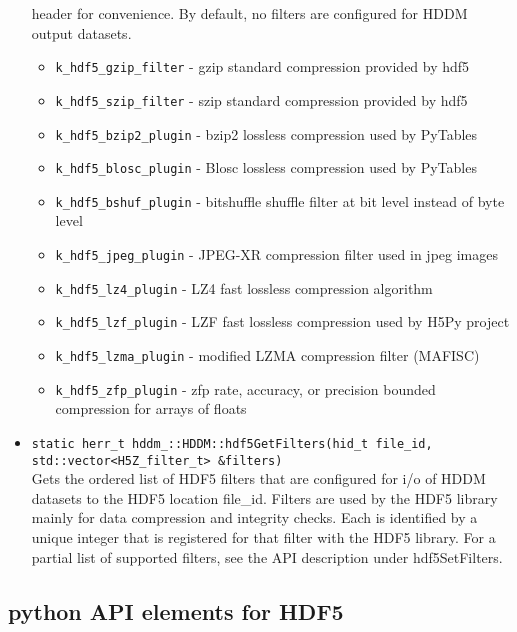 \documentclass{revtex4}
\begin{document}
\begin{itemize}
header for convenience. By default, no filters are configured for HDDM output
datasets.
\begin{itemize}
\item \texttt{k\_hdf5\_gzip\_filter} - gzip standard compression provided by hdf5
\item \texttt{k\_hdf5\_szip\_filter} - szip standard compression provided by hdf5
\item \texttt{k\_hdf5\_bzip2\_plugin} - bzip2 lossless compression used by PyTables
\item \texttt{k\_hdf5\_blosc\_plugin} - Blosc lossless compression used by PyTables
\item \texttt{k\_hdf5\_bshuf\_plugin} - bitshuffle shuffle filter at bit level instead of byte level
\item \texttt{k\_hdf5\_jpeg\_plugin} - JPEG-XR compression filter used in jpeg images
\item \texttt{k\_hdf5\_lz4\_plugin} - LZ4 fast lossless compression algorithm
\item \texttt{k\_hdf5\_lzf\_plugin} - LZF fast lossless compression used by H5Py project
\item \texttt{k\_hdf5\_lzma\_plugin} - modified LZMA compression filter (MAFISC)
\item \texttt{k\_hdf5\_zfp\_plugin} - zfp rate, accuracy, or precision bounded compression for arrays of floats
\end{itemize}
\item \texttt{static herr\_t hddm\_\*::HDDM::hdf5GetFilters(hid\_t file\_id, std::vector<H5Z\_filter\_t> \&filters)}\\
Gets the ordered list of HDF5 filters that are configured for i/o of HDDM
datasets to the HDF5 location file\_id.  Filters are used by the HDF5 library
mainly for data compression and integrity checks. Each is identified by a
unique integer that is registered for that filter with the HDF5 library. For
a partial list of supported filters, see the API description under hdf5SetFilters.
\end{itemize}

\subsection{python API elements for HDF5}
\end{document}

